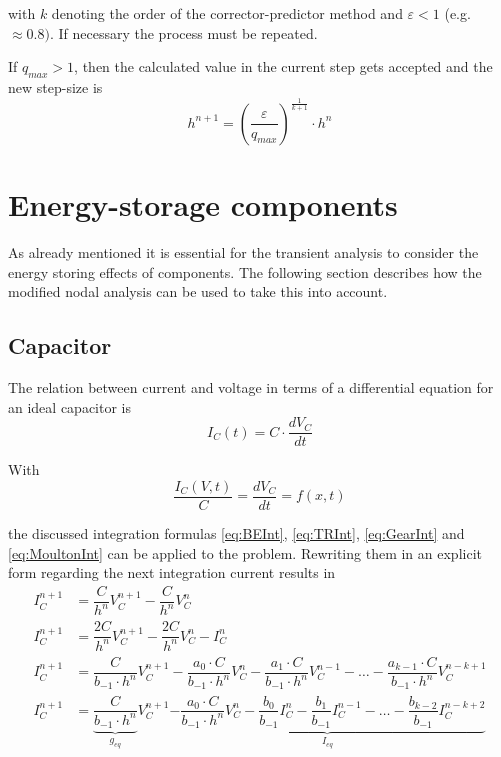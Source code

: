 with $k$ denoting the order of the corrector-predictor method and
$\varepsilon < 1$ (e.g. $\approx 0.8)$.  If necessary the process must
be repeated.

\addvspace{12pt}

If $q_{max} > 1$, then the calculated value in the current step gets
accepted and the new step-size is
\begin{equation}
h^{n+1} = \left(\dfrac{\varepsilon}{q_{max}}\right)^{\tfrac{1}{k + 1}}\cdot h^n
\end{equation}

\section{Energy-storage components}

As already mentioned it is essential for the transient analysis to
consider the energy storing effects of components.  The following
section describes how the modified nodal analysis can be used to take
this into account.

\subsection{Capacitor}

The relation between current and voltage in terms of a differential
equation for an ideal capacitor is
\begin{equation}
\label{eq:ConstCap}
I_C(t) = C\cdot \dfrac{d V_C}{d t}
\end{equation}

With
\begin{equation}
\dfrac{I_C(V, t)}{C} = \dfrac{d V_C}{d t} = f(x,t)
\end{equation}

the discussed integration formulas \eqref{eq:BEInt}, \eqref{eq:TRInt},
\eqref{eq:GearInt} and \eqref{eq:MoultonInt} can be applied to the
problem.  Rewriting them in an explicit form regarding the next
integration current results in
\begin{align}
\label{eq:EulerIC}
I_C^{n+1} &= \dfrac{C}{h^{n}} V_C^{n+1} - \dfrac{C}{h^{n}} V_C^{n}\\
I_C^{n+1} &= \dfrac{2C}{h^{n}} V_C^{n+1} - \dfrac{2C}{h^{n}} V_C^{n} - I_C^n\\
I_C^{n+1} &= \dfrac{C}{b_{-1}\cdot h^{n}} V_C^{n+1} - \dfrac{a_0\cdot C}{b_{-1}\cdot h^{n}} V_C^{n} - \dfrac{a_1\cdot C}{b_{-1}\cdot h^{n}} V_C^{n-1} - \ldots - \dfrac{a_{k-1}\cdot C}{b_{-1}\cdot h^{n}} V_C^{n-k+1}\\
I_C^{n+1} &= \underbrace{\dfrac{C}{b_{-1}\cdot h^{n}}}_{g_{eq}} V_C^{n+1} \underbrace{- \dfrac{a_0\cdot C}{b_{-1}\cdot h^{n}} V_C^{n} - \dfrac{b_0}{b_{-1}} I_C^n - \dfrac{b_1}{b_{-1}} I_C^{n-1} - \ldots - \dfrac{b_{k-2}}{b_{-1}} I_C^{n-k+2}}_{I_{eq}}
\end{align}

